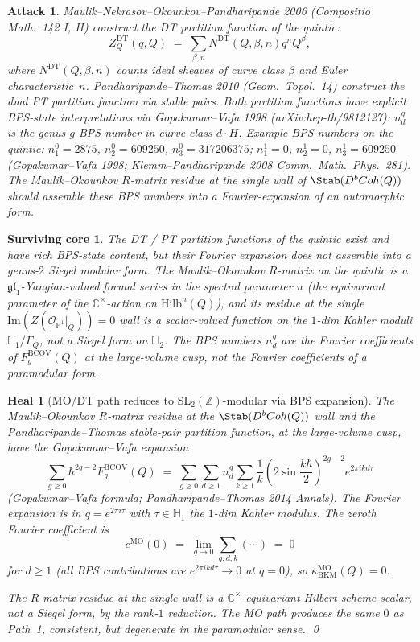 \documentclass[11pt]{amsart}
\newtheorem{attack}[theorem]{Attack}
\newtheorem{surviving}[theorem]{Surviving core}
\newtheorem{heal}[theorem]{Heal}
\providecommand{\C}{\mathbb{C}}
\providecommand{\Z}{\mathbb{Z}}
\providecommand{\P}{\mathbb{P}}
\providecommand{\cO}{\mathcal{O}}
\providecommand{\SL}{\mathrm{SL}}
\providecommand{\Coh}{\mathrm{Coh}}
\providecommand{\MO}{\mathrm{MO}}
\providecommand{\DT}{\mathrm{DT}}
\providecommand{\kBKM}{\kappa_{\mathrm{BKM}}}
\providecommand{\Hilb}{\mathrm{Hilb}}
\begin{document}
\begin{attack}
\label{att:mnop-quintic}
Maulik--Nekrasov--Okounkov--Pandharipande 2006
(\textit{Compositio Math.}~142 I, II) construct the DT partition
function of the quintic:
\[
Z^{\DT}_Q(q, Q) \;=\; \sum_{\beta, n} N^{\DT}(Q, \beta, n) q^n Q^\beta,
\]
where $N^{\DT}(Q, \beta, n)$ counts ideal sheaves of curve class
$\beta$ and Euler characteristic~$n$. Pandharipande--Thomas 2010
(\textit{Geom.\ Topol.}~14) construct the dual PT partition function
via stable pairs. Both partition functions have explicit BPS-state
interpretations via Gopakumar--Vafa 1998 (arXiv:hep-th/9812127):
$n^g_d$ is the genus-$g$ BPS number in curve class $d \cdot H$.
Example BPS numbers on the quintic: $n^0_1 = 2875$, $n^0_2 = 609250$,
$n^0_3 = 317206375$; $n^1_1 = 0$, $n^1_2 = 0$, $n^1_3 = 609250$
(Gopakumar--Vafa 1998; Klemm--Pandharipande 2008
\textit{Comm.\ Math.\ Phys.}~281). The Maulik--Okounkov $R$-matrix
residue at the single wall of $\Stab(D^b\Coh(Q))$ should assemble
these BPS numbers into a Fourier-expansion of an automorphic form.
\end{attack}

\begin{surviving}
\label{surv:mnop-rank-1-reduction}
The DT / PT partition functions of the quintic exist and have
rich BPS-state content, but their Fourier expansion does not
assemble into a genus-$2$ Siegel modular form. The Maulik--Okounkov
$R$-matrix on the quintic is a $\mathfrak{gl}_1$-Yangian-valued
formal series in the spectral parameter $u$ (the equivariant
parameter of the $\C^\times$-action on $\Hilb^n(Q)$), and its
residue at the single $\mathrm{Im}(Z(\cO_{\P^1}|_Q)) = 0$ wall
is a scalar-valued function on the $1$-dim Kahler moduli
$\mathbb{H}_1 / \Gamma_Q$, not a Siegel form on $\mathbb{H}_2$.
The BPS numbers $n^g_d$ are the Fourier coefficients of
$F_g^{\mathrm{BCOV}}(Q)$ at the large-volume cusp, not the
Fourier coefficients of a paramodular form.
\end{surviving}

\begin{heal}[MO/DT path reduces to $\SL_2(\Z)$-modular via BPS expansion]
\label{heal:mo-quintic-sl2}
The Maulik--Okounkov $R$-matrix residue at the $\Stab(D^b\Coh(Q))$
wall and the Pandharipande--Thomas stable-pair partition function,
at the large-volume cusp, have the Gopakumar--Vafa expansion
\[
\sum_{g \geq 0} \hbar^{2g - 2} F_g^{\mathrm{BCOV}}(Q)
\;=\; \sum_{g \geq 0} \sum_{d \geq 1} n^g_d \sum_{k \geq 1}
\frac{1}{k} \left(2 \sin \frac{k \hbar}{2}\right)^{2g - 2}
e^{2\pi i k d \tau}
\]
(Gopakumar--Vafa formula; Pandharipande--Thomas 2014 Annals). The
Fourier expansion is in $q = e^{2\pi i \tau}$ with $\tau \in
\mathbb{H}_1$ the $1$-dim Kahler modulus. The zeroth Fourier
coefficient is
\[
c^{\MO}(0) \;=\; \lim_{q \to 0} \sum_{g, d, k} (\cdots) \;=\; 0
\]
for $d \geq 1$ (all BPS contributions are $e^{2\pi i k d \tau} \to 0$
at $q = 0$), so $\kBKM^{\MO}(Q) = 0$.

The $R$-matrix residue at the single wall is a $\C^\times$-equivariant
Hilbert-scheme scalar, not a Siegel form, by the rank-$1$ reduction.
The MO path produces the same $0$ as Path~1, consistent, but
degenerate in the paramodular sense.
\qed
\end{heal}
\end{document}

